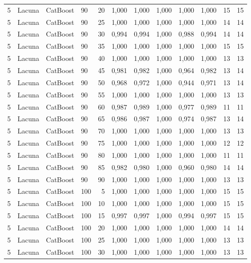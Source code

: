 \begin{longtable}{ccclrrrrrrrr}
5 & Lacuna & CatBoost & 90 & 20 & 1,000 & 1,000 & 1,000 & 1,000 & 1,000 & 15 & 15 \\
5 & Lacuna & CatBoost & 90 & 25 & 1,000 & 1,000 & 1,000 & 1,000 & 1,000 & 14 & 14 \\
5 & Lacuna & CatBoost & 90 & 30 & 0,994 & 0,994 & 1,000 & 0,988 & 0,994 & 14 & 14 \\
5 & Lacuna & CatBoost & 90 & 35 & 1,000 & 1,000 & 1,000 & 1,000 & 1,000 & 15 & 15 \\
5 & Lacuna & CatBoost & 90 & 40 & 1,000 & 1,000 & 1,000 & 1,000 & 1,000 & 13 & 13 \\
5 & Lacuna & CatBoost & 90 & 45 & 0,981 & 0,982 & 1,000 & 0,964 & 0,982 & 13 & 14 \\
5 & Lacuna & CatBoost & 90 & 50 & 0,968 & 0,972 & 1,000 & 0,944 & 0,971 & 13 & 14 \\
5 & Lacuna & CatBoost & 90 & 55 & 1,000 & 1,000 & 1,000 & 1,000 & 1,000 & 13 & 13 \\
5 & Lacuna & CatBoost & 90 & 60 & 0,987 & 0,989 & 1,000 & 0,977 & 0,989 & 11 & 11 \\
5 & Lacuna & CatBoost & 90 & 65 & 0,986 & 0,987 & 1,000 & 0,974 & 0,987 & 13 & 14 \\
5 & Lacuna & CatBoost & 90 & 70 & 1,000 & 1,000 & 1,000 & 1,000 & 1,000 & 13 & 13 \\
5 & Lacuna & CatBoost & 90 & 75 & 1,000 & 1,000 & 1,000 & 1,000 & 1,000 & 12 & 12 \\
5 & Lacuna & CatBoost & 90 & 80 & 1,000 & 1,000 & 1,000 & 1,000 & 1,000 & 11 & 11 \\
5 & Lacuna & CatBoost & 90 & 85 & 0,982 & 0,980 & 1,000 & 0,960 & 0,980 & 14 & 14 \\
5 & Lacuna & CatBoost & 90 & 90 & 1,000 & 1,000 & 1,000 & 1,000 & 1,000 & 13 & 13 \\
5 & Lacuna & CatBoost & 100 & 5 & 1,000 & 1,000 & 1,000 & 1,000 & 1,000 & 15 & 15 \\
5 & Lacuna & CatBoost & 100 & 10 & 1,000 & 1,000 & 1,000 & 1,000 & 1,000 & 15 & 15 \\
5 & Lacuna & CatBoost & 100 & 15 & 0,997 & 0,997 & 1,000 & 0,994 & 0,997 & 15 & 15 \\
5 & Lacuna & CatBoost & 100 & 20 & 1,000 & 1,000 & 1,000 & 1,000 & 1,000 & 14 & 14 \\
5 & Lacuna & CatBoost & 100 & 25 & 1,000 & 1,000 & 1,000 & 1,000 & 1,000 & 13 & 13 \\
5 & Lacuna & CatBoost & 100 & 30 & 1,000 & 1,000 & 1,000 & 1,000 & 1,000 & 13 & 13 \\

\end{longtable}

